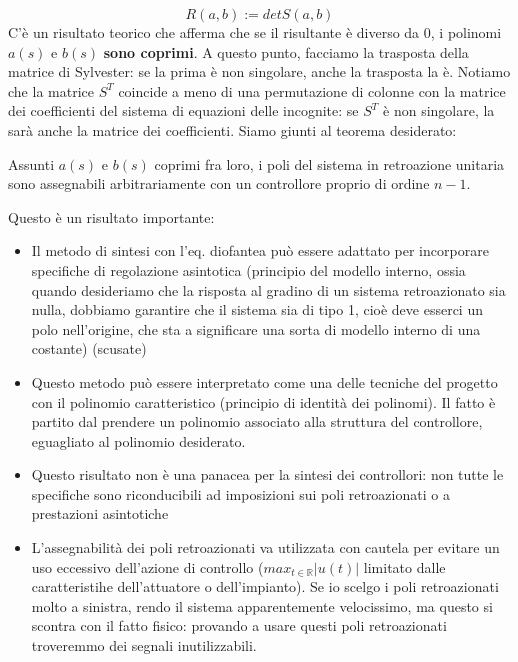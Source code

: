\documentclass[11pt]{article}
\begin{document}
\begin{displaymath}
    R(a,b):=det S(a,b)
\end{displaymath}
C'è un risultato teorico che afferma che se il risultante è diverso da 0, i polinomi $a(s)$ e $b(s)$ \textbf{sono coprimi}. A questo punto, facciamo la trasposta della matrice di Sylvester: se la prima è non singolare, anche la trasposta la è. Notiamo che la matrice $S^T$ coincide a meno di una permutazione di colonne con la matrice dei coefficienti del sistema di equazioni delle incognite: se $S^T$ è non singolare, la sarà anche la matrice dei coefficienti. Siamo giunti al teorema desiderato:
\begin{center}
    Assunti $a(s)$ e $b(s)$ coprimi fra loro, i poli del sistema in retroazione unitaria sono assegnabili arbitrariamente con un controllore proprio di ordine $n-1$.
\end{center}
Questo è un risultato importante:
\begin{itemize}
    \item Il metodo di sintesi con l'eq. diofantea può essere adattato per incorporare specifiche di regolazione asintotica (principio del modello interno, ossia quando desideriamo che la risposta al gradino di un sistema retroazionato sia nulla, dobbiamo garantire che il sistema sia di tipo 1, cioè deve esserci un polo nell'origine, che sta a significare una sorta di modello interno di una costante) (scusate)
    \item Questo metodo può essere interpretato come una delle tecniche del progetto con il polinomio caratteristico (principio di identità dei polinomi). Il fatto è partito dal prendere un polinomio associato alla struttura del controllore, eguagliato al polinomio desiderato.
    \item Questo risultato non è una panacea per la sintesi dei controllori: non tutte le specifiche sono riconducibili ad imposizioni sui poli retroazionati o a prestazioni asintotiche
    \item L'assegnabilità dei poli retroazionati va utilizzata con cautela per evitare un uso eccessivo dell'azione di controllo ($max_{t\in\mathbb{R}}|u(t)|$ limitato dalle caratteristihe dell'attuatore o dell'impianto). Se io scelgo i poli retroazionati molto a sinistra, rendo il sistema apparentemente velocissimo, ma questo si scontra con il fatto fisico: provando a usare questi poli retroazionati troveremmo dei segnali inutilizzabili.
\end{itemize}
\end{document}
